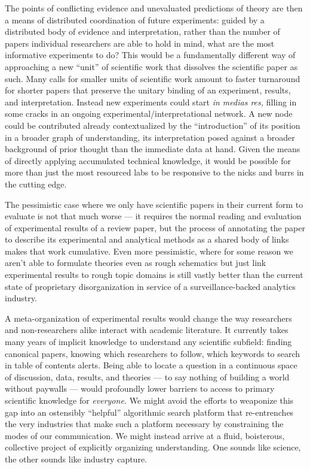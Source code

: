 The points of conflicting evidence and unevaluated predictions of theory
are then a means of distributed coordination of future experiments:
guided by a distributed body of evidence and interpretation, rather than
the number of papers individual researchers are able to hold in mind,
what are the most informative experiments to do? This would be a
fundamentally different way of approaching a new ``unit'' of scientific
work that dissolves the scientific paper as such. Many calls for smaller
units of scientific work amount to faster turnaround for shorter papers
that preserve the unitary binding of an experiment, results, and
interpretation. Instead new experiments could start \emph{in medias
res,} filling in some cracks in an ongoing experimental/interpretational
network. A new node could be contributed already contextualized by the
``introduction'' of its position in a broader graph of understanding,
its interpretation posed against a broader background of prior thought
than the immediate data at hand. Given the means of directly applying
accumulated technical knowledge, it would be possible for more than just
the most resourced labs to be responsive to the nicks and burrs in the
cutting edge.

The pessimistic case where we only have scientific papers in their
current form to evaluate is not that much worse --- it requires the
normal reading and evaluation of experimental results of a review paper,
but the process of annotating the paper to describe its experimental and
analytical methods as a shared body of links makes that work cumulative.
Even more pessimistic, where for some reason we aren't able to formulate
theories even as rough schematics but just link experimental results to
rough topic domains is still vastly better than the current state of
proprietary disorganization in service of a surveillance-backed
analytics industry.

A meta-organization of experimental results would change the way
researchers and non-researchers alike interact with academic literature.
It currently takes many years of implicit knowledge to understand any
scientific subfield: finding canonical papers, knowing which researchers
to follow, which keywords to search in table of contents alerts. Being
able to locate a question in a continuous space of discussion, data,
results, and theories --- to say nothing of building a world without
paywalls --- would profoundly lower barriers to access to primary
scientific knowledge for \emph{everyone.} We might avoid the efforts to
weaponize this gap into an ostensibly ``helpful'' algorithmic search
platform that re-entrenches the very industries that make such a
platform necessary by constraining the modes of our communication. We
might instead arrive at a fluid, boisterous, collective project of
explicitly organizing understanding. One sounds like science, the other
sounds like industry capture.

